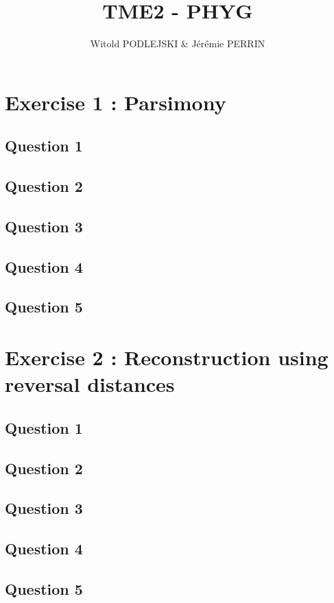 \documentclass[]{article}
\title{TME2 - PHYG}
\author{Witold PODLEJSKI \& Jérémie PERRIN}
\begin{document}
\maketitle

\section{Exercise 1 : Parsimony}
\subsection{Question 1}
\subsection{Question 2}
\subsection{Question 3}
\subsection{Question 4}
\subsection{Question 5}


\section{Exercise 2 : Reconstruction using reversal distances}
\subsection{Question 1}
\subsection{Question 2}
\subsection{Question 3}
\subsection{Question 4}
\subsection{Question 5}
\end{document}
